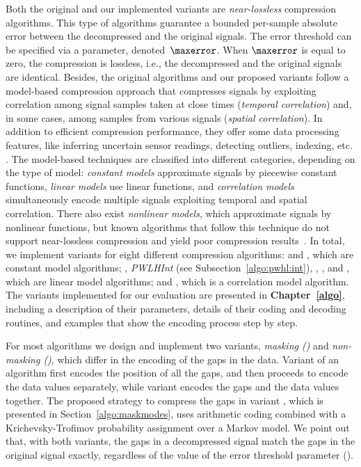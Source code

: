 Both the original and our implemented variants are \textit{near-lossless} compression algorithms. This type of algorithms guarantee a bounded per-sample absolute error between the decompressed and the original signals. The error threshold can be specified via a parameter, denoted~$\maxerror$. When $\maxerror$ is equal to zero, the compression is lossless, i.e., the decompressed and the original signals are identical. Besides, the original algorithms and our proposed variants follow a model-based compression approach that compresses signals by exploiting correlation among signal samples taken at close times (\textit{temporal correlation}) and, in some cases, among samples from various signals (\textit{spatial correlation}). In addition to efficient compression performance, they offer some data processing features, like inferring uncertain sensor readings, detecting outliers, indexing, etc. \cite{AnEva2013}. The model-based techniques are classified into different categories, depending on the type of model: \textit{constant models} approximate signals by piecewise constant functions, \textit{linear models} use linear functions, and \textit{correlation models} simultaneously encode multiple signals exploiting temporal and spatial correlation. There also exist \textit{nonlinear models}, which approximate signals by nonlinear functions, but known algorithms that follow this technique do not support near-lossless compression and yield poor compression results~\cite{AnEva2013}. In total, we implement variants for eight different compression algorithms: \textit{\PCAfull} \cite{coder:pca} and \textit{\APCAfull} \cite{coder:apca}, which are constant model algorithms; \textit{\PWLHfull} \cite{coder:pwlh}, \textit{PWLHInt} (see Subsection~\ref{algo:pwhl:int}), \textit{\CAfull} \cite{coder:ca}, \textit{\SFfull} \cite{coder:sf}, and \textit{\FRfull} \cite{coder:fr}, which are linear model algorithms; and \textit{\GAMPSfull} \cite{coder:gamps}, which is a correlation model algorithm. The variants implemented for our evaluation are presented in \textbf{Chapter~\ref{algo}}, including a description of their parameters, details of their coding and decoding routines, and examples that show the encoding process step by step.


For most algorithms we design and implement two variants, \textit{masking (\maskalgo)} and \textit{non-masking (\NOmaskalgo)}, which differ in the encoding of the gaps in the data. Variant \maskalgo of an algorithm first encodes the position of all the gaps, and then proceeds to encode the data values separately, while variant \NOmaskalgo encodes the gaps and the data values together. The proposed strategy to compress the gaps in variant \maskalgo, which is presented in Section~\ref{algo:maskmodes}, uses arithmetic coding \cite{ac2, Cover2005} combined with a Krichevsky-Trofimov probability assignment \cite{ktestimator} over a Markov model. We point out that, with both variants, the gaps in a decompressed signal match the gaps in the original signal exactly, regardless of the value of the error threshold parameter (\maxerror).  



